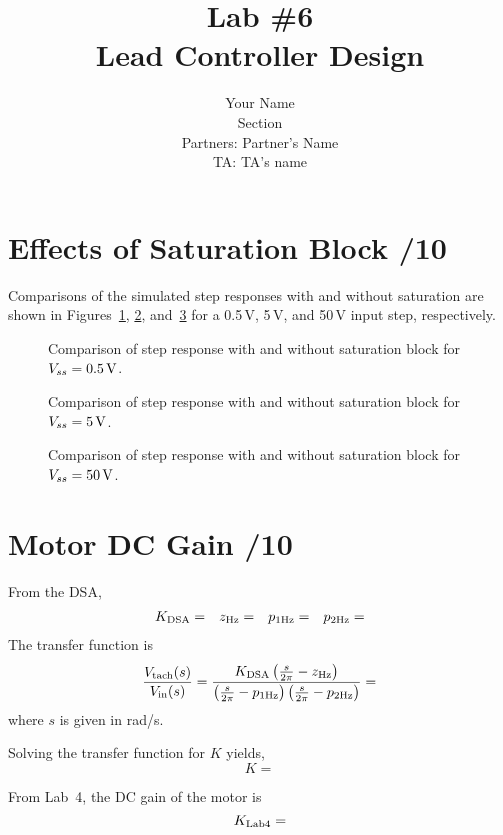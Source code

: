\documentclass{article}
\title{Lab \#6\\{\sc Lead Controller Design}}
\author{Your Name\\ Section\\
  Partners: Partner's Name\\
  TA: TA's name}
\newcommand{\score}{\hfill \underline{\hspace{1cm}}/}
\begin{document}
\maketitle
{}
\section{{\sc Effects of Saturation Block} \score 10}
Comparisons of the simulated step responses with and without saturation are shown in Figures~\ref{fig:v05}, \ref{fig:v5}, and~\ref{fig:v50} for a 0.5\,V, 5\,V, and 50\,V input step, respectively.

\begin{figure}[htbp]
\centering
\caption{Comparison of step response with and without saturation block for $V_{ss}=0.5\,{\rm V}$.}
\label{fig:v05}
\end{figure}

\begin{figure}[htbp]
\centering
\caption{Comparison of step response with and without saturation block for $V_{ss}=5\,{\rm V}$.}
\label{fig:v5}
\end{figure}

\begin{figure}[htbp]
\centering
\caption{Comparison of step response with and without saturation block for $V_{ss}=50\,{\rm V}$.}
\label{fig:v50}
\end{figure}


\section{{\sc Motor DC Gain} \score 10}
From the DSA, 
\[ \begin{array}{cccc}
K_{\rm DSA}=  & z_{\rm Hz}=  & p_{1\rm Hz}=  & p_{2\rm Hz}= 
\end{array} \]
The transfer function is
$$ \frac{V_{\rm tach}(s)}{V_{\rm in}(s)} = 
	\frac{K_{\rm DSA}\left( \frac{s}{2\pi}-z_{\rm Hz} \right)}{\left(\frac{s}{2\pi}-p_{1\rm Hz}\right)\left(\frac{s}{2\pi}-p_{2\rm Hz} \right)} = 
$$
where $s$ is given in rad/s.

Solving the transfer function for $K$ yields,
$$ K =  $$

From Lab~4, the DC gain of the motor is 
$$ K_{\rm Lab4} =  $$
\end{document}
